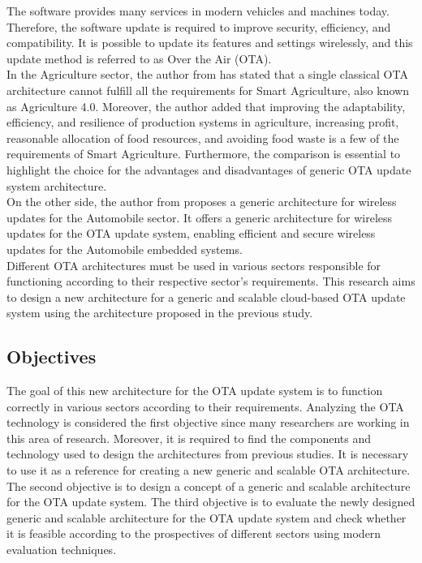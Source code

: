 \documentclass[12pt,a4paper]{article}
\begin{document}
The software provides many services in modern vehicles and machines today. Therefore, the software update is required to improve security, efficiency, and compatibility. It is possible to update its features and settings wirelessly, and this update method is referred to as Over the Air (OTA). \cite{r1} \\

In the Agriculture sector, the author from \cite{r2} has stated that a single classical OTA architecture cannot fulfill all the requirements for Smart Agriculture, also known as Agriculture 4.0. Moreover, the author added that improving the adaptability, efficiency, and resilience of production systems in agriculture, increasing profit, reasonable allocation of food resources, and avoiding food waste is a few of the requirements of Smart Agriculture. Furthermore, the comparison is essential to highlight the choice for the advantages and disadvantages of generic OTA update system architecture. \\

On the other side, the author from \cite{r3} proposes a generic architecture for wireless updates for the Automobile sector. It offers a generic architecture for wireless updates for the OTA update system, enabling efficient and secure wireless updates for the Automobile embedded systems. \\

Different OTA architectures must be used in various sectors responsible for functioning according to their respective sector's requirements. This research aims to design a new architecture for a generic and scalable cloud-based OTA update system using the architecture proposed in the previous study.

\subsection{Objectives}

The goal of this new architecture for the OTA update system is to function correctly in various sectors according to their requirements. Analyzing the OTA technology is considered the first objective since many researchers are working in this area of research. Moreover, it is required to find the components and technology used to design the architectures from previous studies. It is necessary to use it as a reference for creating a new generic and scalable OTA architecture. The second objective is to design a concept of a generic and scalable architecture for the OTA update system. The third objective is to evaluate the newly designed generic and scalable architecture for the OTA update system and check whether it is feasible according to the prospectives of different sectors using modern evaluation techniques.
\end{document}
